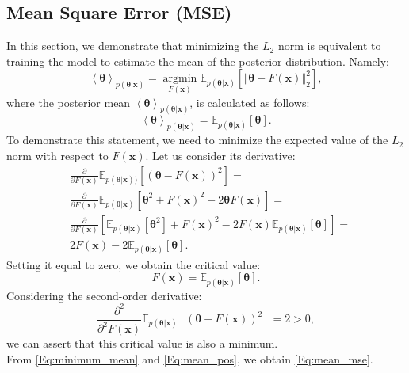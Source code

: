 \documentclass{aa}
\begin{document}
\begin{appendix}
\section{Mean Square Error (MSE)}\label{Sec:appendix_Mean Square Error}
In this section, we demonstrate that minimizing the $L_2$ norm is equivalent to training the model to estimate the mean of the posterior distribution. Namely:
\begin{equation}\label{Eq:mean_mse}
\left \langle \bm {\theta} \right \rangle_{p(\bm {\theta}|\bm{x})}=\operatorname*{argmin}_{F(\bm{x})}\mathbb{E}_{p(\bm {\theta}|\bm {x})}[\left\Vert \bm {\theta}-F(\bm{x})
 \right \Vert_{2}^{2}],
\end{equation}
where the posterior mean $\left \langle \bm {\theta} \right \rangle_{p(\bm {\theta}|\bm{x})}$, is calculated as follows:
\begin{equation}\label{Eq:mean_pos}
     \left \langle \bm {\theta} \right \rangle_{p(\bm {\theta}|\bm{x})}= \mathbb{E}_{p(\bm {\theta}|\bm {x})}[\bm {\theta}].
\end{equation}
To demonstrate this statement, we need to minimize the expected value of the $L_2$ norm with respect to $F(\bm{x})$. Let us consider its derivative:
\begin{align}\label{Eq:moment_1}
   & \frac{\partial}{\partial F(\bm{x}) }  \mathbb{E}_{p(\bm {\theta}|\bm{x}))}[(\bm {\theta}-F(\bm{x}))^2] =  \\
    &
    \frac{\partial}{\partial F(\bm{x}) }  \mathbb{E}_{p(\bm {\theta}|\bm {x})}[\bm {\theta}^2+F(\bm{x})^2-2\bm {\theta}F(\bm{x})] = \nonumber \\
    &
    \frac{\partial}{\partial F(\bm{x}) }  [
    \mathbb{E}_{p(\bm {\theta}|\bm {x})}[\bm {\theta}^2]+F(\bm{x})^2-2F(\bm{x})\mathbb{E}_{p(\bm {\theta}|\bm {x})}[\bm {\theta}]]= \nonumber \\
    &2F(\bm{x})-2 \mathbb{E}_{p(\bm {\theta}|\bm {x})}[\bm {\theta}]. \nonumber
\end{align}
Setting it equal to zero, we obtain the critical value:
\begin{equation}\label{Eq:minimum_mean}
    F(\bm{x})= \mathbb{E}_{p(\bm {\theta}|\bm {x})}[\bm {\theta}]. 
\end{equation}
Considering the second-order derivative:
\begin{equation}
   \frac{\partial^2}{\partial^2 F(\bm{x})}  \mathbb{E}_{p(\bm {\theta}|\bm {x})}[(\bm {\theta}-F(\bm{x}))^2]=2>0, 
\end{equation}
we can assert that this critical value is also a minimum. \\
From \autoref{Eq:minimum_mean} and \autoref{Eq:mean_pos}, we obtain \autoref{Eq:mean_mse}.

\end{appendix}
\end{document}
